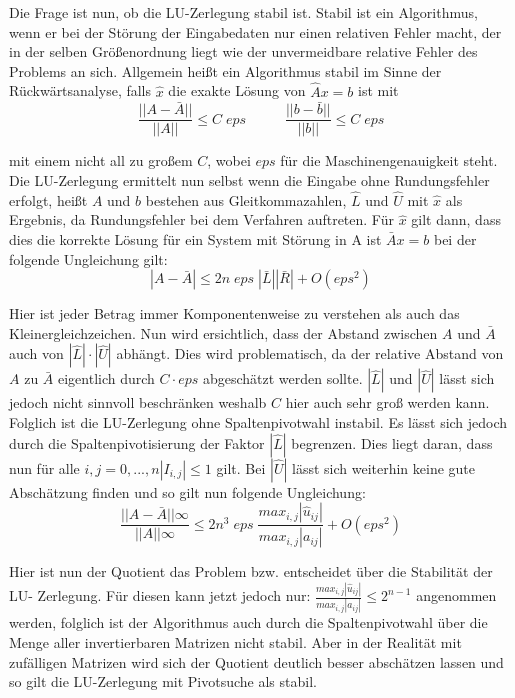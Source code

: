 \documentclass[course=erap]{aspdoc}
\begin{document}
Die Frage ist nun, ob die LU-Zerlegung stabil ist.
Stabil ist ein Algorithmus, wenn er bei der Störung der Eingabedaten nur einen relativen Fehler macht, 
der in der selben Größenordnung liegt wie der unvermeidbare relative Fehler des Problems an sich. 
Allgemein heißt ein Algorithmus stabil im Sinne der Rückwärtsanalyse, 
falls $\hat{x}$ die exakte Lösung von $\hat{A}x = b$ ist mit 							
  \begin{equation}
    \label{norm}
    \frac{|| A - \bar{A}||}{||A||} \leq C \; eps \;\; \;\;\;\;\;\;\;\;  \frac{|| b - \bar{b}||}{||b||} \leq C \; eps
  \end{equation}

mit einem nicht all zu großem $C$, wobei $eps$ für die Maschinengenauigkeit steht.
Die LU-Zerlegung ermittelt nun selbst wenn die Eingabe ohne 
Rundungsfehler erfolgt, heißt $A$ und $b$ bestehen aus Gleitkommazahlen, $\hat{L}$ und $\hat{U}$ mit 
$\hat{x}$ als Ergebnis, da Rundungsfehler bei dem Verfahren auftreten. Für $\hat{x}$ gilt 
dann, dass dies die korrekte Lösung für ein System mit Störung in A ist $\bar{A}x=b$ bei der 
folgende Ungleichung gilt:
  \begin{equation}
    \label{eg3}
    |A - \bar{A}| \leq 2n \; eps \; |\bar{L}||\bar{R}| + O(eps^2)
  \end{equation}

Hier ist jeder Betrag immer Komponentenweise zu verstehen als auch das Kleinergleichzeichen.										%
Nun wird ersichtlich, dass der Abstand zwischen $A$ und $\bar{A}$ auch von $|\hat{L}| \cdot |\hat{U}|$
abhängt. Dies wird problematisch, da der relative Abstand von $A$ zu $\bar{A}$ eigentlich durch 
$C\cdot eps$ abgeschätzt werden sollte. $|\hat{L}|$ und $|\hat{U}|$ lässt sich jedoch nicht sinnvoll 
beschränken weshalb $C$ hier auch sehr groß werden kann.
Folglich ist die LU-Zerlegung ohne Spaltenpivotwahl instabil. Es lässt sich jedoch durch die Spaltenpivotisierung 
der Faktor $|\hat{L}|$  begrenzen. Dies liegt daran, dass nun für alle $i,j = 0,...,n |I_{i,j}| \leq 1$ gilt. 
Bei $|\hat{U}|$ lässt sich weiterhin keine gute Abschätzung finden und so gilt nun folgende Ungleichung:  
  \begin{equation}
    \label{eg3}
    \frac{||A - \bar{A}||\infty}{||A||\infty} \leq 2n^3 \; eps \;\frac{max_{i,j}| \hat{u}_{ij}|}{max_{i,j}|a_{ij}|} + O(eps^2)
  \end{equation}

Hier ist nun der Quotient das Problem bzw. entscheidet über die Stabilität der LU-
Zerlegung. Für diesen kann jetzt jedoch nur: $\frac{max_{i,j}| \hat{u}_{ij}|}{max_{i,j}|a_{ij}|} \leq 2^{n-1}$ angenommen 
werden, folglich ist der Algorithmus auch durch die Spaltenpivotwahl über die Menge 
aller invertierbaren Matrizen nicht stabil. Aber in der Realität mit zufälligen Matrizen wird 
sich der Quotient deutlich besser abschätzen lassen und so gilt die LU-Zerlegung mit Pivotsuche als stabil.
\end{document}
